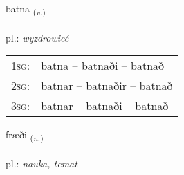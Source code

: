 \documentclass[frontgrid, backgrid]{flacards}\usepackage[]{graphicx}\usepackage[]{xcolor}
\begin{document}
\renewcommand{\blhead}{\vskip5pt {\small\bfseries\footnotesize Sagnorð | czasownik }}
\renewcommand{\bcfoot}{\vskip5pt \hspace{2pt}{\small\bfseries\footnotesize 3K}}


{batna \small{\textsubscript{(\textit{v.})}} \\[1ex] %
\textphonetic{[pahtna]} \\
pl.: \emph{wyzdrowieć} \\  [2ex]
\renewcommand*{\arraystretch}{0.8}
\begin{tabular}{p{1cm}l}
\textsc{1sg}: & batna -- batnaði -- batnað \\ 
\textsc{2sg}: & batnar -- batnaðir -- batnað \\ 
\textsc{3sg}: & batnar -- batnaði -- batnað \\ 
\end{tabular}
}

\renewcommand{\flhead}{\vskip5pt \fboxsep=0pt {\small\bfseries\footnotesize Nafnorð | rzeczownik}}
\renewcommand{\fcfoot}{\vskip5pt \fboxsep=0pt \hspace{2pt}{\small\bfseries\footnotesize 3K}}

\renewcommand{\blhead}{\vskip5pt {\small\bfseries\footnotesize Nafnorð | rzeczownik }}
\renewcommand{\bcfoot}{\vskip5pt \hspace{2pt}{\small\bfseries\footnotesize 3K}}


{fræði \small{\textsubscript{(\textit{n.})}} \\[1ex] %
\textphonetic{[fraiːðɪ]} \\
pl.: \emph{nauka, temat} \\  [2ex]
\renewcommand*{\arraystretch}{0.8}
}
\end{document}
